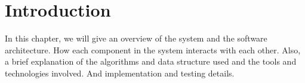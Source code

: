 \section{Introduction}



In this chapter, we will give an overview of the system and the software architecture. How each component in the system interacts with each other. Also, a brief explanation of the algorithms and data structure used and the tools and technologies involved. And implementation and testing details.